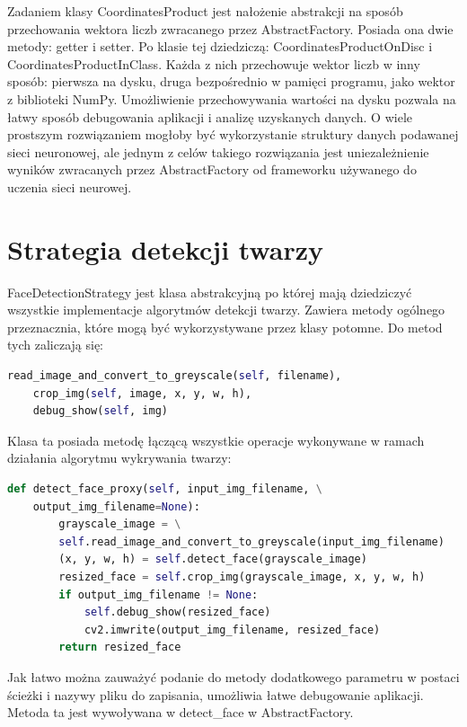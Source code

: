 \documentclass[oneside, eng]{mgr}
\begin{document}
Zadaniem klasy CoordinatesProduct jest nałożenie abstrakcji na sposób przechowania wektora liczb zwracanego przez AbstractFactory. Posiada ona dwie metody: getter i setter. Po klasie tej dziedziczą: CoordinatesProductOnDisc i CoordinatesProductInClass. Każda z nich przechowuje wektor liczb w inny sposób: pierwsza na dysku, druga bezpośrednio w pamięci programu, jako wektor z biblioteki NumPy. Umożliwienie przechowywania wartości na dysku pozwala na łatwy sposób debugowania aplikacji i analizę uzyskanych danych. O wiele prostszym rozwiązaniem mogłoby być wykorzystanie struktury danych podawanej sieci neuronowej, ale jednym z celów takiego rozwiązania jest uniezależnienie wyników zwracanych przez AbstractFactory od frameworku używanego do uczenia sieci neurowej.

\section{Strategia detekcji twarzy}

FaceDetectionStrategy jest klasa abstrakcyjną po której mają dziedziczyć wszystkie implementacje algorytmów detekcji twarzy. Zawiera metody ogólnego przeznacznia, które mogą być wykorzystywane przez klasy potomne. Do metod tych zaliczają się:

\begin{lstlisting}[language=Python]
	read_image_and_convert_to_greyscale(self, filename),
	crop_img(self, image, x, y, w, h),
	debug_show(self, img)
\end{lstlisting}

Klasa ta posiada metodę łączącą wszystkie operacje wykonywane w ramach działania algorytmu wykrywania twarzy:

\begin{lstlisting}[language=Python]
    def detect_face_proxy(self, input_img_filename, \
    output_img_filename=None):
        grayscale_image = \
        self.read_image_and_convert_to_greyscale(input_img_filename)
        (x, y, w, h) = self.detect_face(grayscale_image)
        resized_face = self.crop_img(grayscale_image, x, y, w, h)
        if output_img_filename != None:
        	self.debug_show(resized_face)
            cv2.imwrite(output_img_filename, resized_face)
        return resized_face
\end{lstlisting}

Jak łatwo można zauważyć podanie do metody dodatkowego parametru w postaci ścieżki i nazywy pliku do zapisania, umożliwia łatwe debugowanie aplikacji. Metoda ta jest wywoływana w detect\_face w AbstractFactory.
\end{document}
